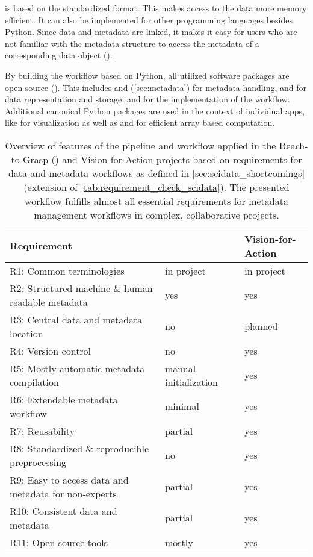  is based on the standardized  format. This makes access to the data more memory efficient. It can also be implemented for other programming languages besides Python. Since data and metadata are linked, it makes it easy for users who are not familiar with the metadata structure to access the metadata of a corresponding data object ().

By building the workflow based on Python, all utilized software packages are open-source (). This includes  and  (\cref{sec:metadata}) for metadata handling,  and  for data representation and storage, and  for the implementation of the workflow. Additional  canonical Python packages are used in the context of individual apps, like  for visualization as well as  and  for efficient array based computation.

\begin{table}[]
\footnotesize
\begin{tabular}{lll}
\hline
Requirement                                          &  \cite{Brochier_2018} & Vision-for-Action \\  \hline
R1: Common terminologies                             &  in project & in project \\ 
R2: Structured machine \& human readable metadata    &  yes & yes \\ 
R3: Central data and metadata location               &  no & planned \\ 
R4: Version control                                  &  no & yes \\ 
R5: Mostly automatic metadata compilation            &  manual initialization & yes \\ 
R6: Extendable metadata workflow                     &  minimal & yes \\ 
R7: Reusability                                      &  partial & yes \\ 
R8: Standardized \& reproducible preprocessing       &  no & yes \\ 
R9: Easy to access data and metadata for non-experts &  partial & yes \\ 
R10: Consistent data and metadata                    &  partial & yes \\ 
R11: Open source tools                               &  mostly & yes \\ \hline
\end{tabular}
\caption[Overview of workflow features for Vision-for-Action project]{Overview of features of the pipeline and workflow applied in the Reach-to-Grasp (\cite{Brochier_2018}) and Vision-for-Action projects based on requirements for data and metadata workflows as defined in \cref{sec:scidata_shortcomings} (extension of \cref{tab:requirement_check_scidata}). The presented workflow fulfills almost all essential requirements for metadata management workflows in complex, collaborative projects.}
\label{tab:requirement_check_v4a}
\end{table}


